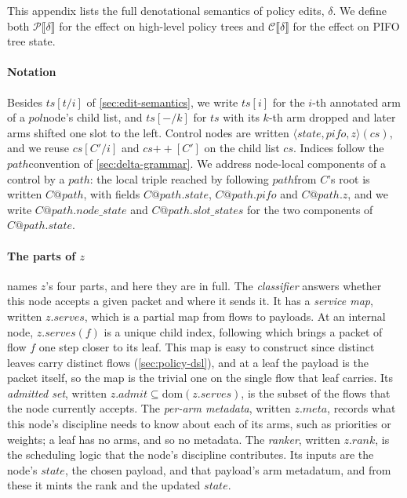 \documentclass[sigplan,anonymous,review,nonacm]{acmart}
\newcommand{\csem}[1]{\mathcal{C}\llbracket #1 \rrbracket}
\newcommand{\psem}[1]{\mathcal{P}\llbracket #1 \rrbracket}
\newcommand{\notation}[1]{\ensuremath{#1}\ifmmode\else\xspace\fi}
\newcommand{\pol}{\notation{\mathit{pol}}}
\newcommand{\zz}{\notation{\mathit{z}}}
\newcommand{\stt}{\notation{\mathit{state}}}
\newcommand{\pth}{\notation{\mathit{path}}}
\begin{document}
This appendix lists the full denotational semantics of policy edits, $\delta$.
We define both $\psem{\delta}$ for the effect on high-level policy trees
and $\csem{\delta}$ for the effect on PIFO tree state.

\paragraph{Notation}

Besides \(\mathit{ts}[t/i]\) of \cref{sec:edit-semantics}, we write \(\mathit{ts}[i]\) for the \(i\)-th annotated arm of a \pol node's child list, and \(\mathit{ts}[-/k]\) for \(\mathit{ts}\) with its \(k\)-th arm dropped and later arms shifted one slot to the left.
Control nodes are written \(\langle\mathit{state}, \mathit{pifo}, \mathit{z}\rangle(\mathit{cs})\), and we reuse \(\mathit{cs}[C'/i]\) and \(\mathit{cs}\mathbin{+\!\!+}[C']\) on the child list \(\mathit{cs}\).
Indices follow the \pth convention of \cref{sec:delta-grammar}.
We address node-local components of a control by a \pth: the local triple reached by following \pth from \(C\)'s root is written \(C@\mathit{path}\), with fields \(C@\mathit{path}.\mathit{state}\), \(C@\mathit{path}.\mathit{pifo}\) and \(C@\mathit{path}.\mathit{z}\), and we write \(C@\mathit{path}.\mathit{node\_state}\) and \(C@\mathit{path}.\mathit{slot\_states}\) for the two components of \(C@\mathit{path}.\mathit{state}\).

\paragraph{The parts of \zz}

 names \zz's four parts, and here they are in full.
The \emph{classifier} answers whether this node accepts a given packet and where it sends it.
It has a \emph{service map}, written \(\mathit{z}.\mathit{serves}\), which is a partial map from flows to payloads.
At an internal node, \(\mathit{z}.\mathit{serves}(f)\) is a unique child index, following which brings a packet of flow \(f\) one step closer to its leaf.
This map is easy to construct since distinct leaves carry distinct flows (\cref{sec:policy-dsl}), and at a leaf the payload is the packet itself, so the map is the trivial one on the single flow that leaf carries.
Its \emph{admitted set}, written \(\mathit{z}.\mathit{admit} \subseteq \mathrm{dom}(\mathit{z}.\mathit{serves})\), is the subset of the flows that the node currently accepts.
The \emph{per-arm metadata}, written \(\mathit{z}.\mathit{meta}\), records what this node's discipline needs to know about each of its arms, such as priorities or weights; a leaf has no arms, and so no metadata.
The \emph{ranker}, written \(\mathit{z}.\mathit{rank}\), is the scheduling logic that the node's discipline contributes.
Its inputs are the node's \stt, the chosen payload, and that payload's arm metadatum, and from these it mints the rank and the updated \stt.
\end{document}
